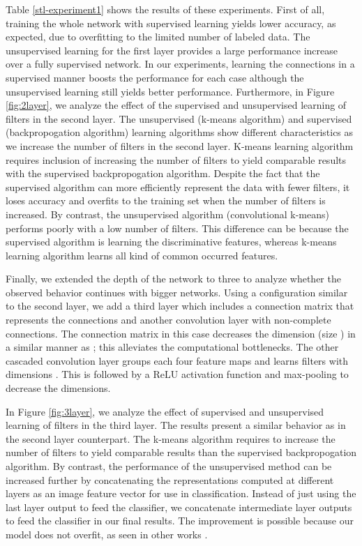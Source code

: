 \documentclass{article} \usepackage{iclr2016_workshop,times}
\begin{document}
Table \ref{stl-experiment1} shows the results of these experiments. First of all, training the whole network with supervised learning yields lower accuracy, as expected, due to overfitting to the limited number of labeled data.
The unsupervised learning for the first layer provides a large performance increase over a fully supervised network.
In our experiments, learning the connections in a supervised manner boosts the performance for each case although the unsupervised learning still yields better performance. Furthermore, in Figure \ref{fig:2layer}, we analyze the effect of the supervised and unsupervised learning of filters in the second layer.
The unsupervised (k-means algorithm) and supervised (backpropogation algorithm) learning algorithms show different characteristics as we increase the number of filters in the second layer.
K-means learning algorithm requires inclusion of increasing the number of filters to yield comparable results with the supervised backpropogation algorithm.
Despite the fact that the supervised algorithm can more efficiently represent the data with fewer filters, it loses accuracy and overfits to the training set when the number of filters is increased.
By contrast, the unsupervised algorithm (convolutional k-means) performs poorly with a low number of filters.
This difference can be because the supervised algorithm is learning the discriminative features, whereas k-means learning algorithm learns all kind of common occurred features.

Finally, we extended the depth of the network to three to analyze whether the observed behavior continues with bigger networks.
Using a configuration similar to the second layer, we add a third layer which includes a connection matrix that represents the connections and another convolution layer with non-complete connections.
The connection matrix in this case decreases the dimension (size ) in a similar manner as \citet{szegedy2014going}; this alleviates the computational bottlenecks.
The other cascaded convolution layer groups each four feature maps and learns filters with dimensions . This is followed by a ReLU activation function and max-pooling  to decrease the dimensions.

In Figure \ref{fig:3layer}, we analyze the effect of supervised and unsupervised learning of filters in the third layer.
The results present a similar behavior as in the second layer counterpart.
The k-means algorithm requires to increase the number of filters to yield comparable results than the supervised backpropogation algorithm.
By contrast, the performance of the unsupervised method can be increased further by concatenating the representations computed at different layers as an image feature vector for use in classification.
Instead of just using the last layer output to feed the classifier, we concatenate intermediate layer outputs to feed the classifier in our final results. The improvement is possible because our model does not overfit, as seen in other works \citep{coates2011selecting,lin2014stable}.
\end{document}
